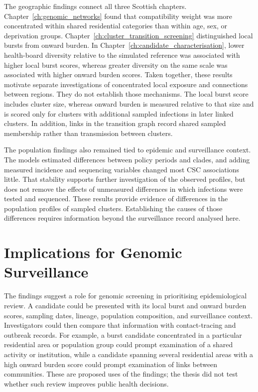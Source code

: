 The geographic findings connect all three Scottish chapters. Chapter~\ref{ch:genomic_networks} found that compatibility weight was more concentrated within shared residential categories than within age, sex, or deprivation groups. Chapter~\ref{ch:cluster_transition_screening} distinguished local bursts from onward burden. In Chapter~\ref{ch:candidate_characterisation}, lower health-board diversity relative to the simulated reference was associated with higher local burst scores, whereas greater diversity on the same scale was associated with higher onward burden scores. Taken together, these results motivate separate investigations of concentrated local exposure and connections between regions. They do not establish those mechanisms. The local burst score includes cluster size, whereas onward burden is measured relative to that size and is scored only for clusters with additional sampled infections in later linked clusters. In addition, links in the transition graph record shared sampled membership rather than transmission between clusters.

The population findings also remained tied to epidemic and surveillance context. The models estimated differences between policy periods and clades, and adding measured incidence and sequencing variables changed most CSC associations little. That stability supports further investigation of the observed profiles, but does not remove the effects of unmeasured differences in which infections were tested and sequenced. These results provide evidence of differences in the population profiles of sampled clusters. Establishing the causes of those differences requires information beyond the surveillance record analysed here.

\section{Implications for Genomic Surveillance}\label{sec:ch7_triage_layer}

The findings suggest a role for genomic screening in prioritising epidemiological review. A candidate could be presented with its local burst and onward burden scores, sampling dates, lineage, population composition, and surveillance context. Investigators could then compare that information with contact-tracing and outbreak records. For example, a burst candidate concentrated in a particular residential area or population group could prompt examination of a shared activity or institution, while a candidate spanning several residential areas with a high onward burden score could prompt examination of links between communities. These are proposed uses of the findings; the thesis did not test whether such review improves public health decisions.

